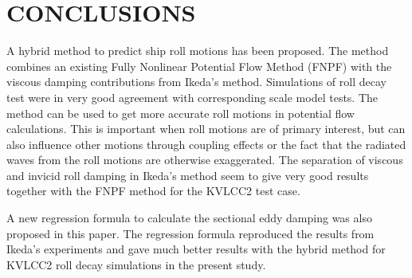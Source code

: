 \section*{CONCLUSIONS}\label{conclusions}

A hybrid method to predict ship roll motions has been proposed. The
method combines an existing Fully Nonlinear Potential Flow Method (FNPF)
with the viscous damping contributions from Ikeda's method. Simulations
of roll decay test were in very good agreement with corresponding scale
model tests. The method can be used to get more accurate roll motions in
potential flow calculations. This is important when roll motions are of
primary interest, but can also influence other motions through coupling
effects or the fact that the radiated waves from the roll motions are
otherwise exaggerated. The separation of viscous and invicid roll
damping in Ikeda's method seem to give very good results together with
the FNPF method for the KVLCC2 test case.

\quad A new regression formula to calculate the sectional eddy damping
was also proposed in this paper. The regression formula reproduced the
results from Ikeda's experiments and gave much better results with the
hybrid method for KVLCC2 roll decay simulations in the present study.

    